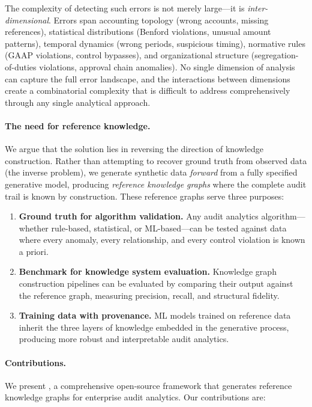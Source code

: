 The complexity of detecting such errors is not merely large---it is
\emph{inter-dimensional}.  Errors span accounting topology (wrong
accounts, missing references), statistical distributions (Benford
violations, unusual amount patterns), temporal dynamics (wrong periods,
suspicious timing), normative rules (GAAP violations, control
bypasses), and organizational structure (segregation-of-duties
violations, approval chain anomalies).  No single dimension of analysis
can capture the full error landscape, and the interactions between
dimensions create a combinatorial complexity that is difficult to address
comprehensively through any single analytical approach.

\paragraph{The need for reference knowledge.}
We argue that the solution lies in reversing the direction of knowledge
construction.  Rather than attempting to recover ground truth from
observed data (the inverse problem), we generate synthetic data
\emph{forward} from a fully specified generative model, producing
\emph{reference knowledge graphs} where the complete audit trail is
known by construction.  These reference graphs serve three purposes:

\begin{enumerate}
  \item \textbf{Ground truth for algorithm validation.}  Any audit
    analytics algorithm---whether rule-based, statistical, or ML-based---can
    be tested against data where every anomaly, every relationship, and
    every control violation is known a priori.

  \item \textbf{Benchmark for knowledge system evaluation.}  Knowledge
    graph construction pipelines can be evaluated by comparing their
    output against the reference graph, measuring precision, recall, and
    structural fidelity.

  \item \textbf{Training data with provenance.}  ML models trained on
    reference data inherit the three layers of knowledge embedded in
    the generative process, producing more robust and interpretable
    audit analytics.
\end{enumerate}

\paragraph{Contributions.}
We present \system{}, a comprehensive open-source framework that generates
reference knowledge graphs for enterprise audit analytics.  Our
contributions are:

